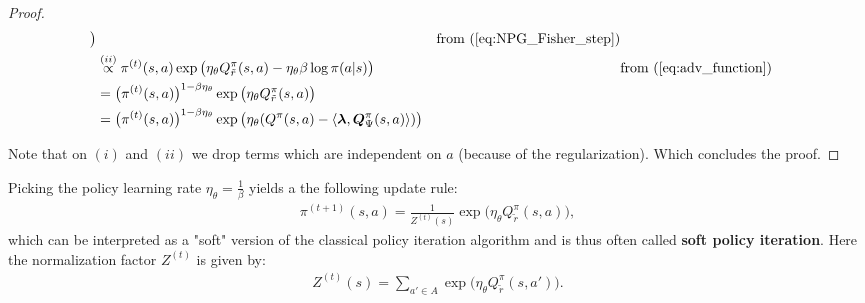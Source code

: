 \begin{proof}
\begin{align*}
    \big) && \text{from (\ref{eq:NPG_Fisher_step})} \\
    &\stackrel{(ii)}{\propto} \pi^{(t)}(s,a) \exp\big(
        \eta_\theta Q_{\tilde{r}}^\pi(s,a) 
        - \eta_\theta \beta \log \pi(a|s) 
    \big) && \text{from (\ref{eq:adv_function})} \\
    &= \bigl( \pi^{(t)}(s,a) \bigr)^{1-\beta \eta_\theta } \exp\big(
        \eta_\theta 
        Q_{\tilde{r}}^\pi(s,a) 
    \big) \\
    &= \bigl( \pi^{(t)}(s,a) \bigr)^{1-\beta \eta_\theta } \exp\big(
        \eta_\theta 
        (Q^\pi(s,a) - \langle \bm{\lambda}, \bm{Q}_\Psi^\pi(s,a) \rangle )
    \big) && \\
\end{align*}

Note that on $(i)$ and $(ii)$ we drop terms which are independent on $a$ (because of the regularization). Which concludes the proof.
\end{proof}

\begin{remark}
    \label{rem:SPI}
    Picking the policy learning rate $\eta_\theta = \frac{1}{\beta}$ yields a the following update rule:
    \begin{align*}
        \pi^{(t+1)}(s,a) = \frac{1}{Z^{(t)}(s)}\exp\big(
            \eta_\theta 
            Q_{\tilde{r}}^\pi(s,a) 
        \big),
    \end{align*}
    which can be interpreted as a "soft" version of the classical policy iteration algorithm and is thus often called \textbf{soft policy iteration}. Here the normalization factor $Z^{(t)}$ is given by:
    \begin{align*}
        Z^{(t)}(s) =  \sum_{a' \in A}\exp\big(
            \eta_\theta 
            Q_{\tilde{r}}^\pi(s,a') 
        \big).
    \end{align*}
\end{remark}

